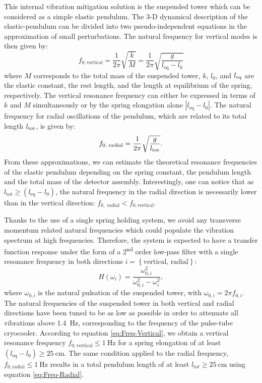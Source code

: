 This internal vibration mitigation solution is the suspended tower which can be considered as a simple elastic pendulum.
The 3-D dynamical description of the elastic-pendulum can be divided into two pseudo-independent equations in the approximation of small perturbations. The natural frequency for vertical modes is then given by:
\begin{equation}
\label{eq:Freq-Vertical}
f_{0,\textrm{vertical}}=\frac{1}{2\pi}\sqrt{\frac{k}{M}} = \frac{1}{2\pi}\sqrt{\frac{g}{l_{\textrm{eq}}-l_{0}}}
\end{equation}
where $M$ corresponds to the total mass of the suspended tower, $k$, $l_0$, and $l_{\rm eq}$ are the elastic constant, the rest length, and the length at equilibrium of the spring, respectively. The vertical resonance frequency can either be expressed in terms of $k$ and $M$ simultaneously or by the spring elongation alone $|l_{\textrm{eq}}-l_{0}|$. The natural frequency for radial oscillations of the pendulum, which are related to its total length  $l_{\rm tot}$, is given by:
\begin{equation}
f_{0,\textrm{ radial}}=\frac{1}{2\pi}\sqrt{\frac{g}{l_{\rm tot}}}\label{eq:Freq-Radial}.
\end{equation}
From these approximations, we can estimate the theoretical resonance frequencies of the elastic pendulum depending on the spring constant, the pendulum length and the total mass of the detector assembly. Interestingly, one can notice that as $l_{\textrm{tot}} \geq (l_{\textrm{eq}}-l_{0})$, the natural frequency in the radial direction is necessarily lower than in the vertical direction: $f_{0,\textrm{ radial}}<f_{0,\textrm{vertical}}$. 

Thanks to the use of a single spring holding system, we avoid any transverse momentum related natural frequencies which could populate the vibration spectrum at high frequencies. Therefore, the system is expected to have a transfer function response under the form of a 2\textsuperscript{nd} order low-pass filter with a single resonance frequency in both directions $i=\left\{ \textrm{vertical, radial}\right\}$:
\begin{equation}
H(\omega_{i})=\frac{\omega_{0,i}^{2}}{\omega_{0,i}^{2}-\omega_{i}^{2}}\label{eq:Transfer-function},
\end{equation}
where $\omega_{0,i}$ is the natural pulsation of the suspended tower, with $\omega_{0,i}=2\pi f_{0,i}$. 
The natural frequencies of the suspended tower in both vertical and radial directions have been tuned to be as low as possible in order to attenuate all vibrations above \SI{1.4}{\Hz}, corresponding to the frequency of the pulse-tube cryocooler. According to equation \ref{eq:Freq-Vertical}, we obtain a vertical resonance frequency $f_{0,\textrm{vertical}} \leq \SI{1}{\Hz}$ for a spring elongation of at least $(l_{\textrm{eq}}-l_{0})\geq \SI{25}{\cm}$. The same condition applied to the radial frequency, $f_{0,\textrm{radial}} \leq \SI{1}{\Hz}$ results in a total pendulum length of at least  $l_{tot}\geq \SI{25}{\cm}$ using equation \ref{eq:Freq-Radial}.

